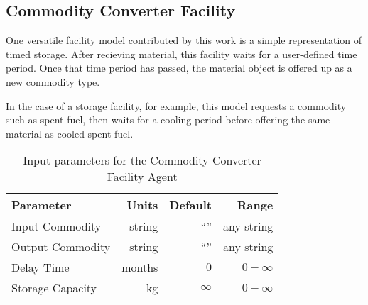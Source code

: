 \subsection{Commodity Converter Facility}

One versatile facility model contributed by this work is a simple 
representation of timed storage. After recieving material, this facility 
waits for a user-defined time period. Once that time period has passed, the 
material object is offered up as a new commodity type. 

In the case of a storage facility, for example, this model requests a commodity 
such as spent fuel, then waits for a cooling period before offering the same 
material as cooled spent fuel.

\begin{table}[h!]
\centering
\begin{tabular}{|l|r|r|r|}
\hline
\textbf{Parameter} & \textbf{Units} & \textbf{Default} & \textbf{Range}\\
\hline
Input Commodity& string & ``'' & any string\\
Output Commodity& string & ``'' & any string\\
Delay Time & months & $0$ & $0-\infty$\\
Storage Capacity & kg & $\infty$ &$0-\infty$ \\
\hline
\end{tabular}
\caption{Input parameters for the Commodity Converter Facility Agent}
\label{tab:commodconverter}
\end{table}

